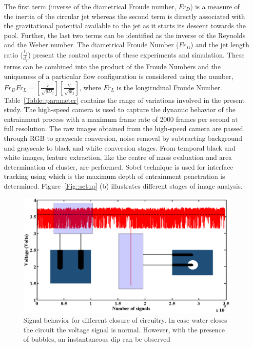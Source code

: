 The first term (inverse of the diametrical Froude number, $Fr_D$) is a measure of the inertia of the circular jet whereas the second term is directly associated with the gravitational potential available to the jet as it starts its descent towards the pool. Further, the last two terms can be identified as the inverse of the Reynolds and the Weber number. The diametrical Froude Number ($Fr_D$) and the jet length ratio ($\frac{l_j}{d_j}$) present the control aspects of these experiments and simulation. These terms can be combined into the product of the Froude Numbers and the uniqueness of a particular flow configuration is considered using the number, $Fr_DFr_L = \left[\frac{V}{\sqrt{gD_j}}\right]\left[\frac{V}{\sqrt{gl_j}}\right]$, where $Fr_L$ is the longitudinal Froude Number. Table~\ref{Table::parameter} contains the range of variations involved in the present study. The high-speed camera is used to capture the dynamic behavior of the entrainment process with a maximum frame rate of 2000 frames per second at full resolution. 
The raw images obtained from the high-speed camera are passed through RGB to grayscale conversion, noise removal by subtracting background and grayscale to black and white conversion stages. From temporal black and white images, feature extraction, like the centre of mass evaluation and area determination of cluster, are performed. Sobel technique is used for interface tracking using which is the maximum depth of entrainment penetration is determined. Figure~\ref{Fig::setup} (b) illustrates different stages of image analysis. \\
\begin{figure}
	\centering
	\includegraphics[width=\linewidth]{chapters/jetPool/Figure2}
	\caption{Signal behavior for different closure of circuitry. In case water closes the circuit the voltage signal is normal. However, with the presence of bubbles, an instantaneous dip can be observed}
	\label{Figure::show}
\end{figure}
